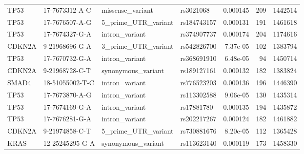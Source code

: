 \begin{footnotesize}
\begin{longtable}{llllrrr}
TP53 & 17-7673312-A-C & missense\_variant & rs3021068 & 0.000145 & 209 & 1442514 \\
TP53 & 17-7676507-A-G & 5\_prime\_UTR\_variant & rs184743157 & 0.000131 & 191 & 1461618 \\
TP53 & 17-7674327-G-A & intron\_variant & rs374907737 & 0.000174 & 204 & 1174616 \\
CDKN2A & 9-21968696-G-A & 3\_prime\_UTR\_variant & rs542826700 & 7.37e-05 & 102 & 1383794 \\
TP53 & 17-7670732-G-A & intron\_variant & rs368691910 & 6.48e-05 & 94 & 1450714 \\
CDKN2A & 9-21968728-C-T & synonymous\_variant & rs189127161 & 0.000132 & 182 & 1383824 \\
SMAD4 & 18-51055002-T-C & intron\_variant & rs776523203 & 0.000136 & 196 & 1446390 \\
TP53 & 17-7673870-A-G & intron\_variant & rs113302588 & 9.06e-05 & 130 & 1435314 \\
TP53 & 17-7674169-G-A & intron\_variant & rs17881780 & 0.000135 & 194 & 1435872 \\
TP53 & 17-7676281-G-A & intron\_variant & rs202217267 & 0.000124 & 182 & 1461882 \\
CDKN2A & 9-21974858-C-T & 5\_prime\_UTR\_variant & rs730881676 & 8.20e-05 & 112 & 1365428 \\
KRAS & 12-25245295-G-A & synonymous\_variant & rs113623140 & 0.000119 & 173 & 1458330 \\
\end{longtable}\end{footnotesize}
